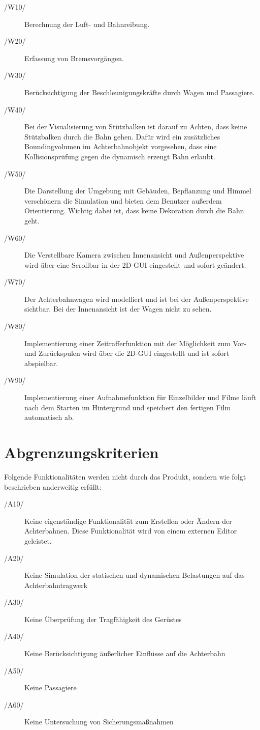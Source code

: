 \begin{description}
	\item[/W10/] Berechnung der Luft- und Bahnreibung.
	\item[/W20/] Erfassung von Bremsvorgängen.
	\item[/W30/] Berücksichtigung der Beschleunigungskräfte durch Wagen und Passagiere.
	\item[/W40/] Bei der Visualisierung von Stützbalken ist darauf zu Achten, dass keine Stützbalken durch die Bahn gehen. Dafür wird ein zusätzliches Boundingvolumen im Achterbahnobjekt vorgesehen, dass eine Kollisionsprüfung gegen die dynamisch erzeugt Bahn erlaubt.
	\item[/W50/] Die Darstellung der Umgebung mit Gebäuden, Bepflanzung und Himmel verschönern die Simulation und bieten dem Benutzer außerdem Orientierung. Wichtig dabei ist, dass keine Dekoration durch die Bahn geht.
	\item[/W60/] Die Verstellbare Kamera zwischen Innenansicht und Außenperspektive wird über eine Scrollbar in der 2D-GUI eingestellt und sofort geändert.
	\item[/W70/] Der Achterbahnwagen wird modelliert und ist bei der Außenperspektive sichtbar. Bei der Innenansicht ist der Wagen nicht zu sehen.
	\item[/W80/] Implementierung einer Zeitrafferfunktion mit der Möglichkeit zum Vor- und Zurückspulen wird über die 2D-GUI eingestellt und ist sofort abspielbar.
	\item[/W90/] Implementierung einer Aufnahmefunktion für Einzelbilder und Filme läuft nach dem Starten im Hintergrund und speichert den fertigen Film automatisch ab.
\end{description}

\section{Abgrenzungskriterien}
Folgende Funktionalitäten werden nicht durch das Produkt, sondern wie folgt
beschrieben anderweitig erfüllt:
\begin{description}
	\item[/A10/] Keine eigenständige Funktionalität zum Erstellen oder Ändern der Achterbahnen. Diese Funktionalität wird von einem externen Editor geleistet.
	\item[/A20/] Keine Simulation der statischen und dynamischen Belastungen auf das Achterbahntragwerk
	\item[/A30/] Keine Überprüfung der Tragfähigkeit des Gerüstes
	\item[/A40/] Keine Berücksichtigung äußerlicher Einflüsse auf die Achterbahn
	\item[/A50/] Keine Passagiere
	\item[/A60/] Keine Untersuchung von Sicherungsmaßnahmen
\end{description}